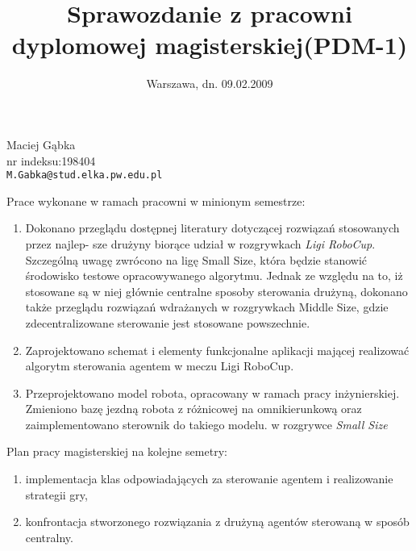 \documentclass[11pt,onecolumn,a4paper,final]{article}
\begin{document}
\begin{minipage}{0.7\textwidth}
 
\begin{flushleft} \large
Maciej Gąbka \\
nr indeksu:198404\\
\texttt{M.Gabka@stud.elka.pw.edu.pl}
\end{flushleft}

\begin{flushright}
\date{Warszawa, dn. 09.02.2009}
\end{flushright}
\end{minipage}

\title{\bfseries Sprawozdanie z pracowni dyplomowej magisterskiej(PDM-1)}
\maketitle
Prace wykonane w ramach pracowni w minionym semestrze:
\begin{enumerate}
 \item  Dokonano przeglądu dostępnej literatury dotyczącej rozwiązań stosowanych przez najlep-
sze drużyny biorące udział w rozgrywkach \emph{Ligi RoboCup}. Szczególną uwagę zwrócono na
ligę Small Size, która będzie stanowić środowisko testowe opracowywanego algorytmu.
Jednak ze względu na to, iż stosowane są w niej głównie centralne sposoby sterowania
drużyną, dokonano także przeglądu rozwiązań wdrażanych w rozgrywkach Middle Size,
gdzie zdecentralizowane sterowanie jest stosowane powszechnie.
\item Zaprojektowano schemat i elementy funkcjonalne aplikacji mającej realizować algorytm
sterowania agentem w meczu Ligi RoboCup.
\item Przeprojektowano model robota,  opracowany w ramach  pracy inżynierskiej. Zmieniono bazę jezdną robota z różnicowej na omnikierunkową oraz zaimplementowano sterownik do takiego modelu.
w rozgrywce \emph{Small Size}

\end{enumerate}

Plan pracy magisterskiej na kolejne semetry:
\begin{enumerate}
 \item implementacja klas odpowiadających za sterowanie agentem i realizowanie strategii gry,
 \item konfrontacja stworzonego rozwiązania z drużyną agentów sterowaną w sposób centralny.
\end{enumerate}
\end{document}
